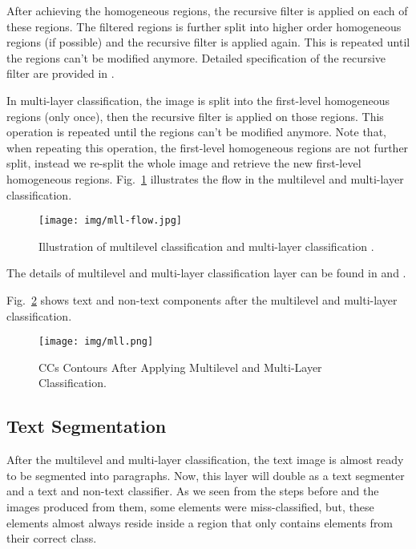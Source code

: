\documentclass[conference]{IEEEtran}
\begin{document}
    After achieving the homogeneous regions, the recursive filter is applied on each of these regions.
    The filtered regions is further split into higher order homogeneous regions (if possible) and the
    recursive filter is applied again. This is repeated until the regions can't be modified anymore.
    Detailed specification of the recursive filter are provided in \cite{mha}.

    In multi-layer classification, the image is split into the first-level homogeneous regions (only once),
    then the recursive filter is applied on those regions. This operation is repeated until the regions
    can't be modified anymore.
    Note that, when repeating this operation, the first-level homogeneous regions are not further split,
    instead we re-split the whole image and retrieve the new first-level homogeneous regions.
    Fig.~\ref{fig:mll} illustrates the flow in the multilevel and multi-layer classification.

    \begin{figure}[htbp]
        \centerline{\texttt{[image: img/mll-flow.jpg]}}
        \caption{Illustration of multilevel classification and multi-layer classification \cite{mhs}.}
        \label{fig:mll}
    \end{figure}

    The details of multilevel and multi-layer classification layer can be found in \cite{mhs} and \cite{mha}.

    Fig.~\ref{img:mll} shows text and non-text components after the multilevel and multi-layer classification.

    \begin{figure}[htbp]
        \centerline{\texttt{[image: img/mll.png]}}
        \caption{CCs Contours After Applying Multilevel and Multi-Layer Classification.}
        \label{img:mll}
    \end{figure}

    \subsection{Text Segmentation}

    After the multilevel and multi-layer classification, the text image is almost ready to be
    segmented into paragraphs.
    Now, this layer will double as a text segmenter and a text and non-text classifier.
    As we seen from the steps before and the images produced from them, some elements were
    miss-classified, but, these elements almost always reside inside a region that only contains
    elements from their correct class.
\end{document}
